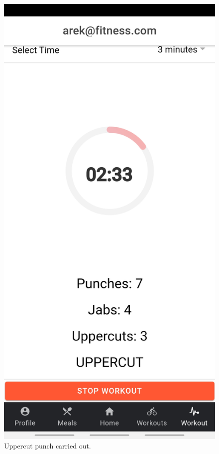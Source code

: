 \documentclass[a4paper,12pt]{report}
\begin{document}
\begin{figure}[ht]
\begin{minipage}[b]{0.5\linewidth}
    \includegraphics[width=.7\linewidth]{images/aplicationImages/uppercutDisplayed.jpeg} 
    \caption{Uppercut punch carried out.} 
    \vspace{4ex}
  \end{minipage}%
  \begin{minipage}[b]{0.5\linewidth}
    \centering

\end{minipage}
\end{figure}
\end{document}
